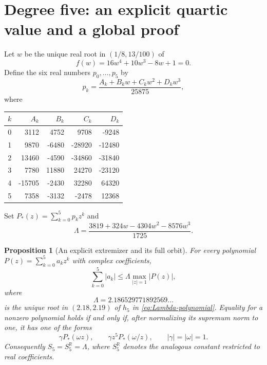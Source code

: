\documentclass[11pt]{article}
\newtheorem{proposition}[theorem]{Proposition}
\newcommand{\R}{\mathbb R}
\begin{document}
\section{Degree five: an explicit quartic value and a global proof}\label{sec:five}

Let $w$ be the unique real root in $(1/8,13/100)$ of
\begin{equation}\label{eq:w-polynomial}
 f(w)=16w^4+10w^3-8w+1=0.
\end{equation}
Define the six real numbers $p_0,\ldots,p_5$ by
\begin{equation}\label{eq:coeff-table}
 p_k=\frac{A_k+B_kw+C_kw^2+D_kw^3}{25875},
\end{equation}
where
\begin{center}
\begin{tabular}{c|rrrr}
\toprule
$k$ & $A_k$ & $B_k$ & $C_k$ & $D_k$\\\midrule
0&3112&4752&9708&-9248\\
1&9870&-6480&-28920&-12480\\
2&13460&-4590&-34860&-31840\\
3&7780&11880&24270&-23120\\
4&-15705&-2430&32280&64320\\
5&7358&-3132&-2478&12368\\\bottomrule
\end{tabular}
\end{center}
Set $P_*(z)=\sum_{k=0}^5p_kz^k$ and
\begin{equation}\label{eq:Lambda}
\Lambda=\frac{3819+324w-4304w^2-8576w^3}{1725}.
\end{equation}

\begin{proposition}[An explicit extremizer and its full orbit]\label{thm:fivewitness}
For every polynomial $P(z)=\sum_{k=0}^5a_kz^k$ with complex coefficients,
\begin{equation}\label{eq:mainineq}
 \sum_{k=0}^5|a_k|\le\Lambda\max_{|z|=1}|P(z)|,
\end{equation}
where
\[
 \Lambda=2.186529771892569\ldots
\]
is the unique root in $(2.18,2.19)$ of $h_5$ in \eqref{eq:Lambda-polynomial}.
Equality for a nonzero polynomial holds if and only if, after normalizing its supremum norm to one, it has one of the forms
\begin{equation}\label{eq:extremizer-orbit}
\gamma P_*(\omega z),\qquad
\gamma z^5P_*(\omega/z),\qquad |\gamma|=|\omega|=1.
\end{equation}
Consequently $S_5=S_5^{\R}=\Lambda$, where $S_5^{\R}$ denotes the analogous constant restricted to real coefficients.
\end{proposition}
\end{document}

